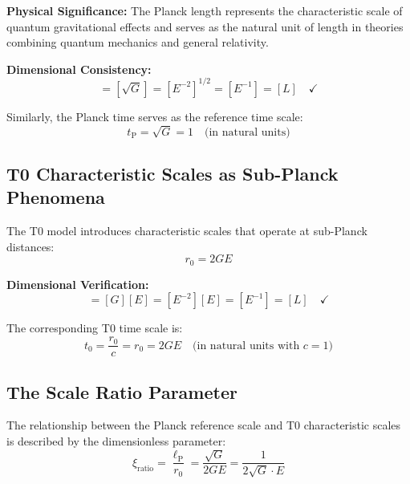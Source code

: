 \documentclass[12pt,a4paper]{report}
\newcommand{\lP}{\ell_{\text{P}}}         %
\newcommand{\tP}{t_{\text{P}}}            %
\newcommand{\rzero}{r_0}                  %
\newcommand{\tzero}{t_0}                  %
\newcommand{\xirat}{\xi_{\text{ratio}}}   %
\begin{document}
	\textbf{Physical Significance:} The Planck length represents the characteristic scale of quantum gravitational effects and serves as the natural unit of length in theories combining quantum mechanics and general relativity.
	
	\textbf{Dimensional Consistency:}
	\begin{equation}
		[\lP] = [\sqrt{G}] = [E^{-2}]^{1/2} = [E^{-1}] = [L] \quad \checkmark
	\end{equation}
	
	Similarly, the Planck time serves as the reference time scale:
	\begin{equation}
		\tP = \sqrt{G} = 1 \quad \text{(in natural units)}
	\end{equation}
	
	\subsection{T0 Characteristic Scales as Sub-Planck Phenomena}\label{subsec:t0_sub_planck}
	
	The T0 model introduces characteristic scales that operate at sub-Planck distances:
	\begin{equation}
		\boxed{\rzero = 2GE}
		\label{eq:t0_characteristic_length}
	\end{equation}
	
	\textbf{Dimensional Verification:}
	\begin{equation}
		[\rzero] = [G][E] = [E^{-2}][E] = [E^{-1}] = [L] \quad \checkmark
	\end{equation}
	
	The corresponding T0 time scale is:
	\begin{equation}
		\tzero = \frac{\rzero}{c} = \rzero = 2GE \quad \text{(in natural units with } c = 1\text{)}
	\end{equation}
	
	\subsection{The Scale Ratio Parameter}\label{subsec:scale_ratio}
	
	The relationship between the Planck reference scale and T0 characteristic scales is described by the dimensionless parameter:
	\begin{equation}
		\boxed{\xirat = \frac{\lP}{\rzero} = \frac{\sqrt{G}}{2GE} = \frac{1}{2\sqrt{G} \cdot E}}
		\label{eq:scale_ratio}
	\end{equation}
	
\end{document}
